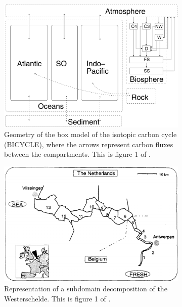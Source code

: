 \begin{figure}[!htp]
	\begin{subfigure}[t]{.47\linewidth}
		\centering
		\includegraphics[width=\textwidth]{fig/intro/boxmodel_KohlerEtAl.png}
		\caption{Geometry of the box model of the isotopic carbon cycle (BICYCLE), where the arrows represent carbon fluxes between the compartments. This is figure 1 of \cite{kohler2005quantitative}.}
	\end{subfigure}
		\begin{subfigure}[t]{.51\linewidth}
		\centering
		\includegraphics[width=\textwidth]{fig/intro/boxmodel_SoetaertHerman.png}
		\caption{Representation of a subdomain decomposition of the Westerschelde. This is figure 1 of \cite{soetaert1995estimating}.}
	\end{subfigure}
	\begin{subfigure}[b]{\linewidth}

\end{subfigure}
\end{figure}
